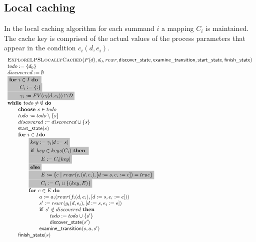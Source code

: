 \documentclass{article}
\newcommand{\emptymap}{\ensuremath{\{ : \}}}
\newcommand{\Space}{\text{\ }}
\newcommand{\If}{\text{\textbf{if }}}
\newcommand{\Do}{\text{\textbf{do }}}
\newcommand{\Then}{\text{\textbf{then }}}
\newcommand{\For}{\text{\textbf{for }}}
\newcommand{\While}{\text{\textbf{while }}}
\newcommand{\Choose}{\text{\textbf{choose }}}
\begin{document}
\subsection{Local caching}
In the local caching algorithm for each summand $i$ a mapping $C_i$ is maintained. The cache key is comprised of the actual values of the process parameters that appear in the condition $c_i(d, e_i)$.
\[
\begin{tabular}{l}
\textsc{ExploreLPSLocallyCached}($P(d), d_0, rewr, \textsf{discover\_state}, \textsf{examine\_transition},
\textsf{start\_state}, \textsf{finish\_state})$ \\
$todo := \{d_0\}$ \\
$discovered := \emptyset$ \\
\colorbox{lightgray}{\For $i \in I$ \Do} \\
\colorbox{lightgray}{\qquad $C_i := \emptymap$} \\
\colorbox{lightgray}{\qquad $\gamma_i := FV(c_i(d, e_i)) \cap \mathcal{D}$} \\
$\While todo \neq \emptyset \Space \Do$ \\
\qquad $\Choose s \in todo$ \\
\qquad $todo := todo \setminus \{s\}$ \\
\qquad $discovered := discovered \cup \{s\}$ \\
\qquad $\textsf{start\_state}(s)$ \\
\qquad $\For i \in I \Do$ \\
\qquad \qquad \colorbox{lightgray}{$key := \gamma_i[d:=s]$} \\
\qquad \qquad \colorbox{lightgray}{\If $key \in keys(C_i)$ \Then} \\
\qquad \qquad \colorbox{lightgray}{\qquad $E := C_i[key]$} \\
\qquad \qquad \colorbox{lightgray}{\textbf{else}} \\
\qquad \qquad \colorbox{lightgray}{\qquad $E := \{ e \mid rewr(c_i(d, e_i), [d:=s,e_i:=e]) = true \}$} \\
\qquad \qquad \colorbox{lightgray}{\qquad $C_i := C_i \cup \{(key, E)\}$} \\
\qquad \qquad $\For e \in E  \Space \Do$ \\
\qquad \qquad \qquad $a := a_i(rewr(f_i(d,e_i), [d:=s,e_i:=e]))$ \\
\qquad \qquad \qquad $s' := rewr(g_i(d,e_i), [d:=s,e_i:=e])$ \\
\qquad \qquad \qquad $\If s' \notin discovered \Space \Then$ \\
\qquad \qquad \qquad \qquad $todo := todo \cup \{ s' \}$ \\
\qquad \qquad \qquad \qquad $\textsf{discover\_state}(s')$ \\
\qquad \qquad \qquad $\textsf{examine\_transition}(s, a, s')$ \\
\qquad $\textsf{finish\_state}(s)$ \\
\end{tabular}
\]
\end{document}
